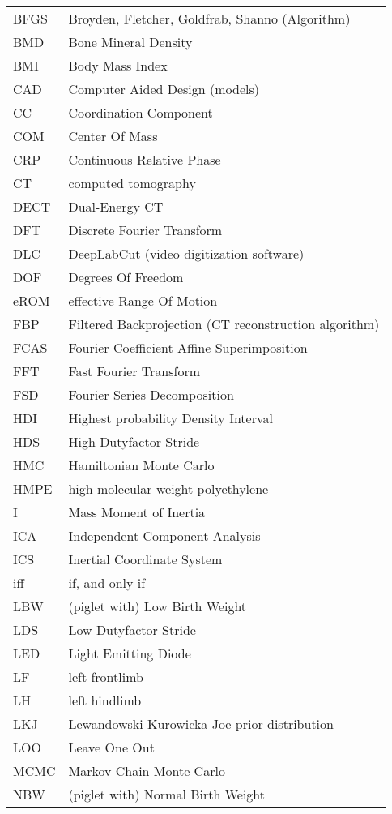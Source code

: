 \begin{small}
\begin{longtable}{l @{ -- } l}
   BFGS & Broyden, Fletcher, Goldfrab, Shanno (Algorithm)
\\ BMD & Bone Mineral Density
\\ BMI & Body Mass Index
\\ CAD & Computer Aided Design (models)
\\ CC & Coordination Component
\\ COM & Center Of Mass
\\ CRP & Continuous Relative Phase
\\ CT & computed tomography
\\ DECT & Dual-Energy CT
\\ DFT & Discrete Fourier Transform
\\ DLC & DeepLabCut (video digitization software)
\\ DOF & Degrees Of Freedom
\\ eROM & effective Range Of Motion
\\ FBP & Filtered Backprojection (CT reconstruction algorithm)
\\ FCAS & Fourier Coefficient Affine Superimposition
\\ FFT & Fast Fourier Transform
\\ FSD & Fourier Series Decomposition
\\ HDI & Highest probability Density Interval
\\ HDS & High Dutyfactor Stride
\\ HMC & Hamiltonian Monte Carlo
\\ HMPE & high-molecular-weight polyethylene
\\ I & Mass Moment of Inertia
\\ ICA & Independent Component Analysis
\\ ICS & Inertial Coordinate System
\\ iff & if, and only if
\\ LBW & (piglet with) Low Birth Weight
\\ LDS & Low Dutyfactor Stride
\\ LED & Light Emitting Diode
\\ LF & left frontlimb
\\ LH & left hindlimb
\\ LKJ & Lewandowski-Kurowicka-Joe prior distribution
\\ LOO & Leave One Out
\\ MCMC & Markov Chain Monte Carlo
\\ NBW & (piglet with) Normal Birth Weight

\end{longtable}
\end{small}
